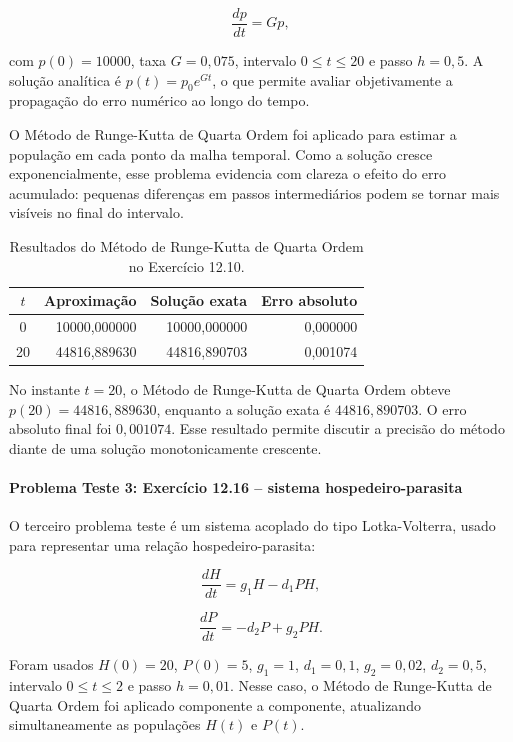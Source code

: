 \[
    \frac{dp}{dt}=Gp,
\]

com \(p(0)=10000\), taxa \(G=0{,}075\), intervalo \(0\leq t\leq 20\) e passo \(h=0{,}5\). A solução analítica é \(p(t)=p_0e^{Gt}\), o que permite avaliar objetivamente a propagação do erro numérico ao longo do tempo.

O Método de Runge-Kutta de Quarta Ordem foi aplicado para estimar a população em cada ponto da malha temporal. Como a solução cresce exponencialmente, esse problema evidencia com clareza o efeito do erro acumulado: pequenas diferenças em passos intermediários podem se tornar mais visíveis no final do intervalo.

\begin{table}[H]
    \centering
    \caption{Resultados do Método de Runge-Kutta de Quarta Ordem no Exercício 12.10.}
    \begin{tabular}{c|r|r|r}
        \textbf{\(t\)} & \textbf{Aproximação} & \textbf{Solução exata} & \textbf{Erro absoluto} \\
        \hline
        0 & 10000{,}000000 & 10000{,}000000 & 0{,}000000 \\
        20 & 44816{,}889630 & 44816{,}890703 & 0{,}001074 \\
    \end{tabular}
\end{table}

No instante \(t=20\), o Método de Runge-Kutta de Quarta Ordem obteve \(p(20)=44816{,}889630\), enquanto a solução exata é \(44816{,}890703\). O erro absoluto final foi \(0{,}001074\). Esse resultado permite discutir a precisão do método diante de uma solução monotonicamente crescente.

\paragraph{Problema Teste 3: Exercício 12.16 -- sistema hospedeiro-parasita}

O terceiro problema teste é um sistema acoplado do tipo Lotka-Volterra, usado para representar uma relação hospedeiro-parasita:

\[
    \frac{dH}{dt}=g_1H-d_1PH,
\]

\[
    \frac{dP}{dt}=-d_2P+g_2PH.
\]

Foram usados \(H(0)=20\), \(P(0)=5\), \(g_1=1\), \(d_1=0{,}1\), \(g_2=0{,}02\), \(d_2=0{,}5\), intervalo \(0\leq t\leq 2\) e passo \(h=0{,}01\). Nesse caso, o Método de Runge-Kutta de Quarta Ordem foi aplicado componente a componente, atualizando simultaneamente as populações \(H(t)\) e \(P(t)\).

